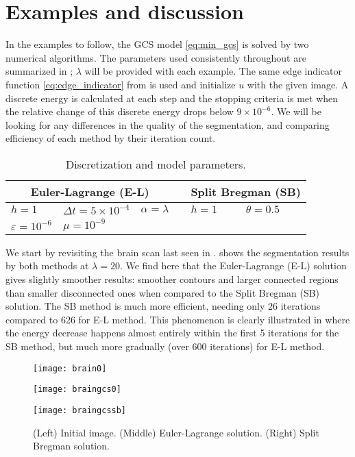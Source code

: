 \section{Examples and discussion}
In the examples to follow, the GCS model \eqref{eq:min_gcs} is solved by two numerical algorithms. The parameters used consistently throughout are summarized in ;  $\lambda$ will be provided with each example. The same edge indicator function \eqref{eq:edge_indicator} from  is used and initialize $u$ with the given image. A discrete energy is calculated at each step and the stopping criteria is met when the relative change of this discrete energy drops below $9\times 10^{-6}$. We will be looking for any differences in the quality of the segmentation, and comparing efficiency of each method by their iteration count.

\begin{table}[htb!]
	\caption[]{Discretization and model parameters.}
	\centering
	\begin{tabular}{lll c ll} \toprule[1.25pt]
		\multicolumn{3}{c}{Euler-Lagrange (E-L)} & \phantom{abc} & \multicolumn{2}{c}{Split Bregman (SB)}
		\\ \midrule
		$h = 1$ & $\Delta t = 5\times 10^{-4}$ & $\alpha = \lambda$ & & $h = 1$ & $\theta = 0.5$
		\\
		$\varepsilon=10^{-6}$ & $\mu = 10^{-9}$
		\\ \bottomrule[1.25pt]
	\end{tabular}
	\label{tab:model parameters}
\end{table}

We start by revisiting the brain scan last seen in .  shows the segmentation results by both methods at $\lambda = 20$. We find here that the Euler-Lagrange (E-L) solution gives slightly smoother results: smoother contours and larger connected regions than smaller disconnected ones when compared to the Split Bregman (SB) solution. The SB method is much more efficient, needing only 26 iterations compared to 626 for E-L method. This phenomenon is clearly illustrated in  where the energy decrease happens almost entirely within the first 5 iterations for the SB method, but much more gradually (over 600 iterations) for E-L method.
\begin{figure}[htb!]
	\centering
	\begin{minipage}{0.31\textwidth}
		\texttt{[image: brain0]}
	\end{minipage}%
	\begin{minipage}{0.31\textwidth}
		\texttt{[image: braingcs0]}
	\end{minipage}%
	\begin{minipage}{0.31\textwidth}
		\texttt{[image: braingcssb]}
	\end{minipage}
	\caption{(Left) Initial image. (Middle) Euler-Lagrange solution. (Right) Split Bregman solution.}
	\label{fig:brain_gcs}
\end{figure}

